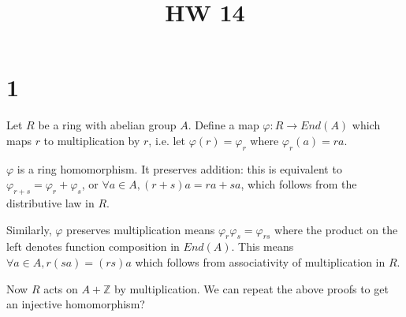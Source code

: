 \documentclass{article}
\title{HW 14}
\date{}
\def\Z{\mathbb{Z}}
\def\vphi{\varphi}
\begin{document}
\maketitle

\section*{1}

Let $R$ be a ring with abelian group $A$. Define a map $\vphi : R \to End(A)$ which maps $r$ to multiplication by $r$, i.e. let $\vphi(r) = \vphi_r$ where $\vphi_r(a) = r a$.

$\vphi$ is a ring homomorphism. It preserves addition: this is equivalent to $\vphi_{r + s} = \vphi_{r} + \vphi_{s}$, or $\forall a \in A, (r+s)a = ra + sa$, which follows from the distributive law in $R$.

Similarly, $\vphi$ preserves multiplication means $\vphi_r \vphi_s = \vphi_{rs}$ where the product on the left denotes function composition in $End(A)$. This means $\forall a \in A, r(sa) = (rs)a$ which follows from associativity of multiplication in $R$.

Now $R$ acts on $A + \Z$ by multiplication. We can repeat the above proofs to get an injective homomorphism?
\end{document}
